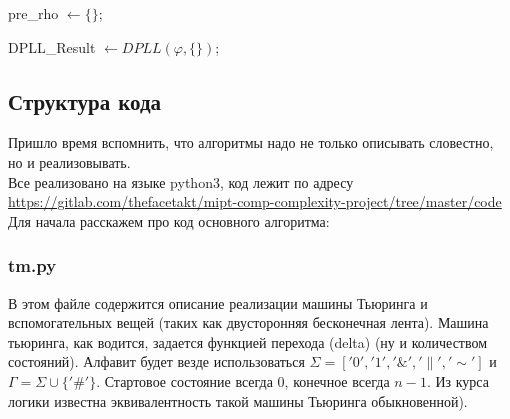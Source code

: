 \documentclass[paper=a4, fontsize=11pt]{scrartcl}
\begin{document}
\pagebreak

\begin{algorithm}[H]
	 {


		pre\_rho $\leftarrow \{\}$;

        DPLL\_Result  $ \leftarrow DPLL(\varphi, \{\})$;

	}
\end{algorithm}



\subsection{Структура кода}

Пришло время вспомнить, что алгоритмы надо не только описывать словестно, но
и реализовывать.\\

Все реализовано на языке python3,
код лежит по адресу \url{https://gitlab.com/thefacetakt/mipt-comp-complexity-project/tree/master/code} \\

Для начала расскажем про код основного алгоритма:\\

\subsubsection{tm.py}

В этом файле содержится описание реализации машины Тьюринга и вспомогательных
вещей (таких как двусторонняя бесконечная лента). Машина тьюринга, как водится,
задается функцией перехода (delta) (ну и количеством состояний).
Алфавит будет везде использоваться $\Sigma = ['0', '1', '\&', '\|', '\sim']$ и
$\Gamma = \Sigma \cup \{'\#'\}$. Стартовое состояние всегда 0, конечное всегда
$n - 1$. Из курса логики известна эквивалентность такой машины Тьюринга
обыкновенной). \\
\end{document}
